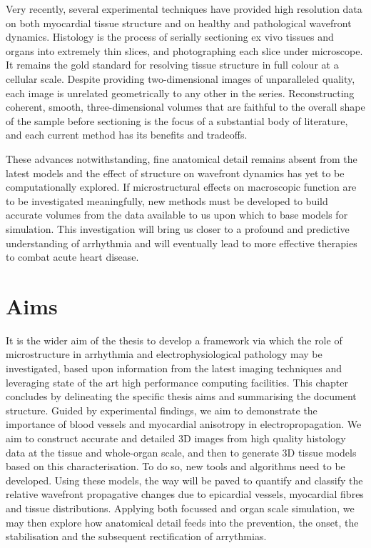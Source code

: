   Very recently, several experimental techniques have provided high resolution data on both myocardial tissue structure and on healthy and pathological wavefront dynamics. Histology is the process of serially sectioning ex vivo tissues and organs into extremely thin slices, and photographing each slice under microscope. It remains the gold standard for resolving tissue structure in full colour at a cellular scale. Despite providing two-dimensional images of unparalleled quality, each image is unrelated geometrically to any other in the series. Reconstructing coherent, smooth, three-dimensional volumes that are faithful to the overall shape of the sample before sectioning is the focus of a substantial body of literature, and each current method has its benefits and tradeoffs. 
  
  These advances notwithstanding, fine anatomical detail remains absent from the latest models and the effect of structure on wavefront dynamics has yet to be computationally explored. If microstructural effects on macroscopic function are to be investigated meaningfully, new methods must be developed to build accurate volumes from the data available to us upon which to base models for simulation. This investigation will bring us closer to a profound and predictive understanding of arrhythmia and will eventually lead to more effective therapies to combat acute heart disease.  
  
\section{Aims}
\label{sec:intro:aims}
  It is the wider aim of the thesis to develop a framework via which the role of microstructure in arrhythmia and electrophysiological pathology may be investigated, based upon information from the latest imaging techniques and leveraging state of the art high performance computing facilities. This chapter concludes by delineating the specific thesis aims and summarising the document structure. Guided by experimental findings, we aim to demonstrate the importance of blood vessels and myocardial anisotropy in electropropagation. We aim to construct accurate and detailed 3D images from high quality histology data at the tissue and whole-organ scale, and then to generate 3D tissue models based on this characterisation. To do so, new tools and algorithms need to be developed. Using these models, the way will be paved to quantify and classify the relative wavefront propagative changes due to epicardial vessels, myocardial fibres and tissue distributions. Applying both focussed and organ scale simulation, we may then explore how anatomical detail feeds into the prevention, the onset, the stabilisation and the subsequent rectification of arrythmias.

